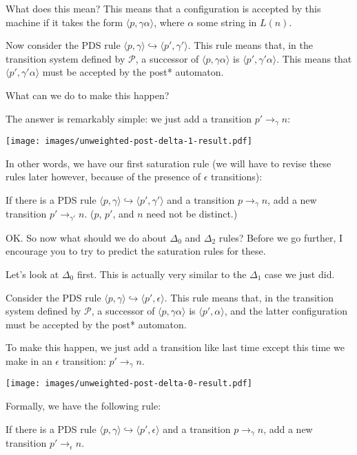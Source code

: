 \documentclass{article}
\newcommand{\Config}[2]{\ensuremath{\langle #1, #2 \rangle}}
\newcommand{\Rule}[2]{\ensuremath{#1 \hookrightarrow #2}}
\newcommand{\Trans}[3]{\ensuremath{#1 \rightarrow_{#2} #3}}
\begin{document}
What does this mean? This means that a configuration is accepted by
this machine if it takes the form \Config{p}{\gamma\alpha}, where
$\alpha$ some string in $L(n)$.

Now consider the PDS rule
\Rule{\Config{p}{\gamma}}{\Config{p'}{\gamma'}}. This rule means that,
in the transition system defined by $\mathcal{P}$, a successor of
\Config{p}{\gamma\alpha} is \Config{p'}{\gamma'\alpha}. This means
that \Config{p'}{\gamma'\alpha} must be accepted by the post*
automaton.

What can we do to make this happen?

The answer is remarkably simple: we just add a transition
$\Trans{p'}{\gamma}{n}$:\\
\begin{center}
  \texttt{[image: images/unweighted-post-delta-1-result.pdf]}
\end{center}

In other words, we have our first saturation rule (we will have to
revise these rules later however, because of the presence of
$\epsilon$ transitions):

   If there is a PDS rule
   \Rule{\Config{p}{\gamma}}{\Config{p'}{\gamma'}} and a transition
   \Trans{p}{\gamma}{n}, add a new transition
   \Trans{p'}{\gamma'}{n}. ($p$, $p'$, and $n$ need not be distinct.)

OK. So now what should we do about $\Delta_0$ and $\Delta_2$ rules?
Before we go further, I encourage you to try to predict the saturation
rules for these.

Let's look at $\Delta_0$ first. This is actually very similar to the
$\Delta_1$ case we just did.

Consider the PDS rule
\Rule{\Config{p}{\gamma}}{\Config{p'}{\epsilon}}. This rule means that,
in the transition system defined by $\mathcal{P}$, a successor of
\Config{p}{\gamma\alpha} is \Config{p'}{\alpha}, and the latter
configuration must be accepted by the post* automaton.

To make this happen, we just add a transition like last time except
this time we make in an $\epsilon$ transition:
$\Trans{p'}{\gamma}{n}$.\\
\begin{center}
  \texttt{[image: images/unweighted-post-delta-0-result.pdf]}
\end{center}


Formally, we have the following rule:

   If there is a PDS rule
   \Rule{\Config{p}{\gamma}}{\Config{p'}{\epsilon}} and a transition
   \Trans{p}{\gamma}{n}, add a new transition
   \Trans{p'}{\epsilon}{n}.
\end{document}
